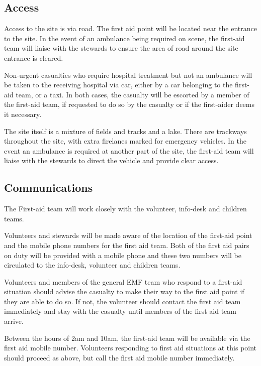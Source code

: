 \subsection{Access}

Access to the site is via road. The first aid point will be located near the
entrance to the site. In the event of an ambulance being required on scene, the
first-aid team will liaise with the stewards to ensure the area of road around
the site entrance is cleared.

Non-urgent casualties who require hospital treatment but not an ambulance will
be taken to the receiving hospital via car, either by a car belonging to the
first-aid team, or a taxi. In both cases, the casualty will be escorted by a
member of the first-aid team, if requested to do so by the casualty or if the
first-aider deems it necessary.

The site itself is a mixture of fields and tracks and a lake. There are
trackways throughout the site, with extra firelanes marked for emergency
vehicles. In the event an ambulance is required at another part of the site,
the first-aid team will liaise with the stewards to direct the vehicle and
provide clear access.

\subsection{Communications}

The First-aid team will work closely with the volunteer, info-desk and children
teams.

Volunteers and stewards will be made aware of the location of the first-aid
point and the mobile phone numbers for the first aid team. Both of the first
aid pairs on duty will be provided with a mobile phone and these two numbers
will be circulated to the info-desk, volunteer and children teams.

Volunteers and members of the general EMF team who respond to a first-aid
situation should advise the casualty to make their way to the first aid point
if they are able to do so. If not, the volunteer should contact the first aid
team immediately and stay with the casualty until members of the first aid team
arrive.

Between the hours of 2am and 10am, the first-aid team will be available via the
first aid mobile number. Volunteers responding to first aid situations at this
point should proceed as above, but call the first aid mobile number
immediately.

